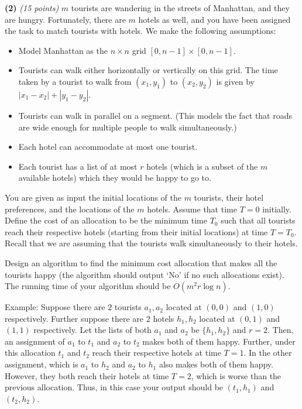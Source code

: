 \documentclass[12pt]{article}
\def\bigap{0.25in}
\begin{document}
\setlength{\parindent}{0in}
\addtolength{\parskip}{0.1cm}
\setlength{\fboxrule}{.5mm}\setlength{\fboxsep}{1.2mm}
\newlength{\boxlength}\setlength{\boxlength}{\textwidth}
\addtolength{\boxlength}{-4mm}
\begin{center}
\end{center}
\vspace{5mm}
\vskip \bigap
{\bf (2)} {\em (15 points)} $m$ tourists are wandering in the streets of Manhattan, and they are hungry. Fortunately, there are $m$ hotels as well, and you have been assigned the task to match tourists with hotels. We make the following assumptions:
\begin{itemize}
\item Model Manhattan as the $n \times n$ grid $[0,n-1] \times [0,n-1]$. 
\item Tourists can walk either horizontally or vertically on this grid. The time taken by a tourist to walk from $(x_1,y_1)$ to $(x_2,y_2)$ is given by $|x_1-x_2| + |y_1-y_2|$.
\item Tourists can walk in parallel on a segment. (This models the fact that roads are wide enough for multiple people to walk simultaneously.)
\item Each hotel can accommodate at most one tourist.
\item Each tourist has a list of at most $r$ hotels (which is a subset of the $m$ available hotels) which they would be happy to go to.
\end{itemize}
You are given as input the initial locations of the $m$ tourists, their hotel preferences, and the locations of the $m$ hotels. Assume that time $T=0$ initially. Define the cost of an allocation to be the minimum time $T_0$ such that all tourists reach their respective hotels (starting from their initial locations) at time $T=T_0$.  Recall that we are assuming that the tourists  walk simultaneously to their hotels. 

Design an algorithm to find the minimum cost allocation that makes all the tourists happy (the algorithm should output `No' if  no such allocations exist). The running time of your algorithm should be $O(m^2 r \log n)$.

Example: Suppose there are $2$ tourists $a_1,a_2$ located at $(0,0)$ and $(1,0)$ respectively. Further suppose there are $2$ hotels $h_1,h_2$ located at $(0,1)$ and $(1,1)$ respectively.  Let the lists of both $a_1$ and $a_2$ be $\{h_1,h_2\}$ and $r=2$. Then, an assignment of $a_1$ to $t_1$ and $a_2$ to $t_2$ makes both of them happy. Further, under this allocation $t_1$ and $t_2$   reach their respective hotels at time $T=1$. In the other assignment, which is  $a_1$ to $h_2$ and $a_2$ to $h_1$ also makes both of them happy. However, they both reach their hotels at time $T=2$, which is worse than the previous allocation.  Thus, in this case your output should be $(t_1,h_1)$ and $(t_2,h_2)$.



\vskip \bigap

\end{document}
